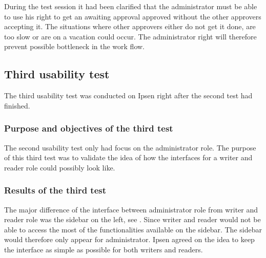 During the test session it had been clarified that the administrator must be able to use his right to get an awaiting approval approved without the other approvers accepting it.
The situations where other approvers either do not get it done, are too slow or are on a vacation could occur.
The administrator right will therefore prevent possible bottleneck in the work flow.



\subsection{Third usability test}\label{thirdtest}
The third usability test was conducted on Ipsen right after the second test had finished.

\subsubsection*{Purpose and objectives of the third test}
The second usability test only had focus on the administrator role.
The purpose of this third test was to validate the idea of how the interfaces for a writer and reader role could possibly look like.

\subsubsection*{Results of the third test}
The major difference of the interface between administrator role from writer and reader role was the sidebar on the left, see .
Since writer and reader would not be able to access the most of the functionalities available on the sidebar.
The sidebar would therefore only appear for administrator.
Ipsen agreed on the idea to keep the interface as simple as possible for both writers and readers.

